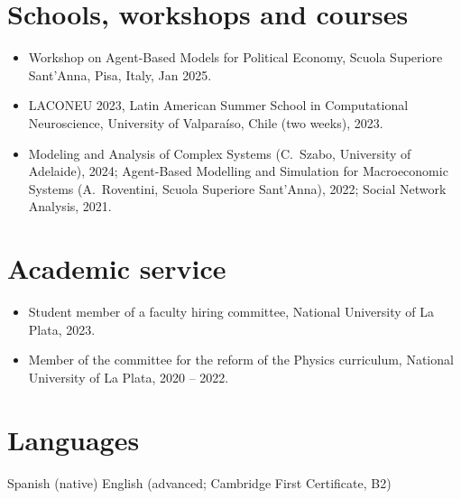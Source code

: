 \documentclass[10pt]{article}
\begin{document}
\section{Schools, workshops and courses}

\begin{itemize}
  \item Workshop on Agent-Based Models for Political Economy, Scuola Superiore Sant'Anna, Pisa, Italy, Jan 2025.
  \item LACONEU 2023, Latin American Summer School in Computational Neuroscience, University of Valparaíso, Chile (two weeks), 2023.
  \item Modeling and Analysis of Complex Systems (C.~Szabo, University of Adelaide), 2024; Agent-Based Modelling and Simulation for Macroeconomic Systems (A.~Roventini, Scuola Superiore Sant'Anna), 2022; Social Network Analysis, 2021.
\end{itemize}

\section{Academic service}

\begin{itemize}
  \item Student member of a faculty hiring committee, National University of La Plata, 2023.
  \item Member of the committee for the reform of the Physics curriculum, National University of La Plata, 2020 -- 2022.
\end{itemize}

\section{Languages}

Spanish (native) \textperiodcentered{} English (advanced; Cambridge First Certificate, B2)
\end{document}
